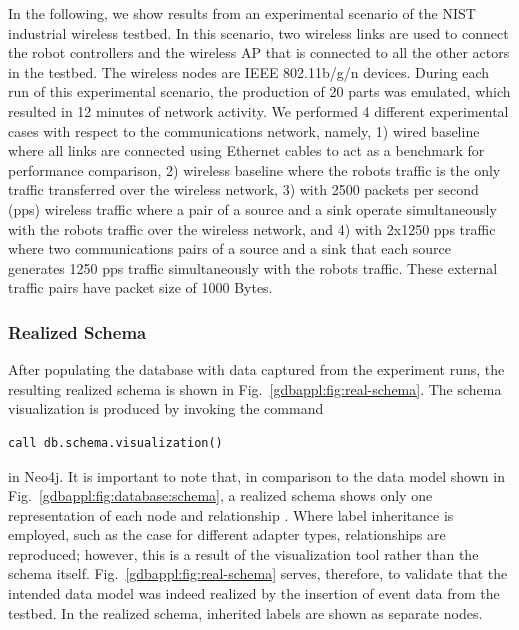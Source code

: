 In the following, we show results from an experimental scenario of the NIST industrial wireless testbed. In this scenario, two wireless links are used to connect the robot controllers and the wireless AP that is connected to all the other actors in the testbed. The wireless nodes are IEEE 802.11b/g/n devices. During each run of this experimental scenario, the production of 20 parts was emulated, which resulted in 12 minutes of network activity. We performed 4 different experimental cases with respect to the communications network, namely, 1) wired baseline where all links are connected using Ethernet cables to act as a benchmark for performance comparison, 2) wireless baseline where the robots traffic is the only traffic transferred over the wireless network, 3) with 2500 packets per second (pps) wireless traffic where a pair of a source and a sink operate simultaneously with the robots traffic over the wireless network, and 4) with 2x1250 pps traffic where two communications pairs of a source and a sink that each source generates 1250 pps traffic simultaneously with the robots traffic. These external traffic pairs have packet size of 1000 Bytes.        
\subsubsection{Realized Schema}

After populating the database with data captured from the experiment runs, the resulting realized schema is shown in Fig.~\ref{gdbappl:fig:real-schema}. The schema visualization is produced by invoking the command

\begin{lstlisting}
call db.schema.visualization()
\end{lstlisting} 
in Neo4j. It is important to note that, in comparison to the data model shown in Fig.~\ref{gdbappl:fig:database:schema}, a realized schema shows only one representation of each node and relationship . Where label inheritance is employed, such as the case for different adapter types, relationships are reproduced; however, this is a result of the visualization tool rather than the schema itself. Fig.~\ref{gdbappl:fig:real-schema} serves, therefore, to validate that the intended data model was indeed realized by the insertion of event data from the testbed. In the realized schema, inherited labels are shown as separate nodes.


